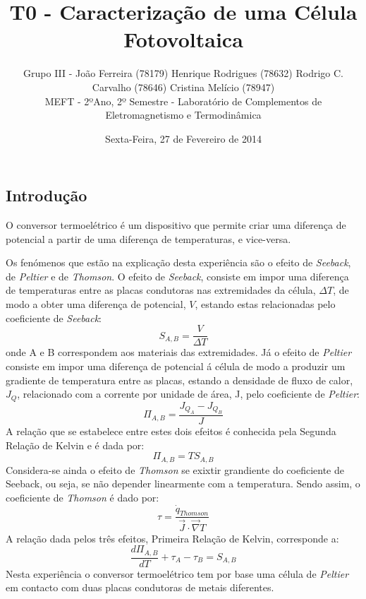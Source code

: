 \documentclass[10pt]{extarticle}
\begin{document}
\title {\bf \huge T0 - Caracterização de uma Célula Fotovoltaica}
\author
{{\small Grupo III - João Ferreira (78179) Henrique Rodrigues (78632) Rodrigo C. Carvalho (78646) Cristina Melício (78947)} \\
{\small MEFT - 2ºAno, 2º Semestre - Laboratório de Complementos de Eletromagnetismo e Termodinâmica}}
\date{{\small Sexta-Feira, 27 de Fevereiro de 2014}}
\maketitle

\begin{multicols}{2}

\section{Introdução}

O conversor termoelétrico é um dispositivo que permite criar uma diferença de potencial a partir de uma diferença de temperaturas, e vice-versa. 

Os fenómenos que estão na explicação desta experiência são o efeito de \textit{Seeback}, de \textit{Peltier} e de \textit{Thomson}. O efeito de \textit{Seeback}, consiste em impor uma diferença de temperaturas entre as placas condutoras nas extremidades da célula, $\Delta T$, de modo a obter uma diferença de potencial, $V$, estando estas relacionadas pelo coeficiente de \textit{Seeback}:
\begin{equation}
S_{A,B} = \frac{V}{\Delta T}
\end{equation}
onde A e B correspondem aos materiais das extremidades. Já o efeito de \textit{Peltier} consiste em impor uma diferença de potencial á célula de modo a produzir um gradiente de temperatura entre as placas, estando a densidade de fluxo de calor, $J_Q$, relacionado com a corrente por unidade de área, J, pelo coeficiente de \textit{Peltier}:
\begin{equation}
\Pi_{A,B} = \frac{J_{Q_{A}}-J_{Q_{B}}}{J}
\end{equation}
A relação que se estabelece entre estes dois efeitos é conhecida pela Segunda Relação de Kelvin e é dada por:
\begin{equation}
\Pi_{A,B} = T S_{A,B}
\end{equation}
Considera-se ainda o efeito de \textit{Thomson} se exixtir grandiente do coeficiente de Seeback, ou seja, se não depender linearmente com a temperatura. Sendo assim, o coeficiente de \textit{Thomson} é dado por:
\begin{equation}
\tau = \frac{\dot{q}_{Thomson}}{\vec{J} \cdot \vec{\nabla} T}
\end{equation}
A relação dada pelos três efeitos, Primeira Relação de Kelvin, corresponde a:
\begin{equation}
\frac{d \Pi_{A,B}}{dT} + \tau_A - \tau_B = S_{A,B}
\end{equation}
Nesta experiência o conversor termoelétrico tem por base uma célula de \textit{Peltier} em contacto com duas placas condutoras de metais diferentes.


\end{multicols}
\end{document}
